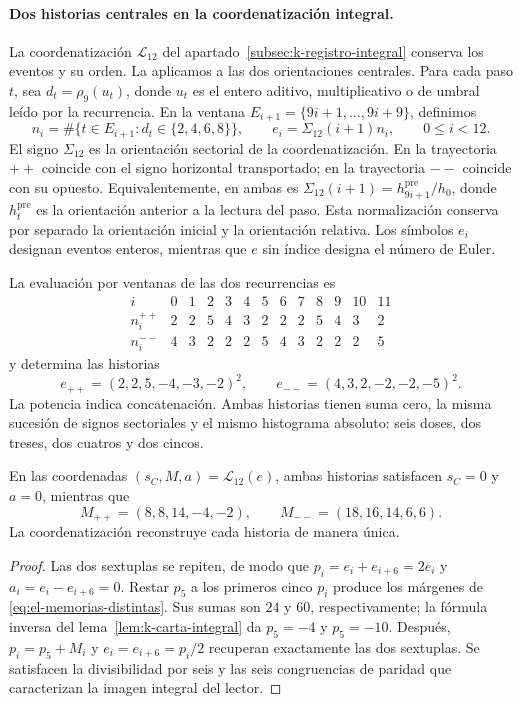 \paragraph{Dos historias centrales en la coordenatización integral.}
La coordenatización \(\mathcal L_{12}\) del
apartado~\ref{subsec:k-registro-integral} conserva los eventos y su
orden. La aplicamos a las dos orientaciones centrales. Para cada
paso \(t\), sea \(d_t=\rho_9(u_t)\), donde \(u_t\) es el entero
aditivo, multiplicativo o de umbral leído por la recurrencia.
En la ventana \(E_{i+1}=\{9i+1,\ldots,9i+9\}\), definimos
\[
 n_i=\#\{t\in E_{i+1}:d_t\in\{2,4,6,8\}\},\qquad
 e_i=\Sigma_{12}(i+1)n_i,\qquad0\le i<12.
\]
El signo \(\Sigma_{12}\) es la orientación sectorial de la coordenatización.
En la trayectoria \({++}\) coincide con el signo horizontal
transportado; en la trayectoria \({--}\) coincide con su opuesto.
Equivalentemente, en ambas es
\(\Sigma_{12}(i+1)=h^{\mathrm{pre}}_{9i+1}/h_0\), donde
\(h^{\mathrm{pre}}_t\) es la orientación anterior a la lectura del paso.
Esta normalización conserva por separado la orientación inicial y
la orientación relativa. Los símbolos \(e_i\) designan eventos
enteros, mientras que \(e\) sin índice designa el número de Euler.

La evaluación por ventanas de las dos recurrencias es
\[
\begin{array}{c|rrrrrrrrrrrr}
i&0&1&2&3&4&5&6&7&8&9&10&11\\\hline
n_i^{++}&2&2&5&4&3&2&2&2&5&4&3&2\\
n_i^{--}&4&3&2&2&2&5&4&3&2&2&2&5
\end{array}
\]
y determina las historias
\begin{equation}
 e_{++}=(2,2,5,-4,-3,-2)^2,\qquad
 e_{--}=(4,3,2,-2,-2,-5)^2.
 \label{eq:el-historias-centrales}
\end{equation}
La potencia indica concatenación. Ambas historias tienen suma cero,
la misma sucesión de signos sectoriales y el mismo histograma
absoluto: seis doses, dos treses, dos cuatros y dos cincos.

\begin{proposition}
\label{prop:el-memorias-distintas}
En las coordenadas \((s_C,M,a)=\mathcal L_{12}(e)\), ambas historias
satisfacen \(s_C=0\) y \(a=0\), mientras que
\begin{equation}
 M_{++}=(8,8,14,-4,-2),\qquad
 M_{--}=(18,16,14,6,6).
 \label{eq:el-memorias-distintas}
\end{equation}
La coordenatización reconstruye cada historia de manera única.
\end{proposition}
\begin{proof}
Las dos sextuplas se repiten, de modo que
\(p_i=e_i+e_{i+6}=2e_i\) y \(a_i=e_i-e_{i+6}=0\).
Restar \(p_5\) a los primeros cinco \(p_i\) produce los márgenes
de \eqref{eq:el-memorias-distintas}. Sus sumas son \(24\) y
\(60\), respectivamente; la fórmula inversa del
lema~\ref{lem:k-carta-integral} da \(p_5=-4\) y \(p_5=-10\).
Después, \(p_i=p_5+M_i\) y
\(e_i=e_{i+6}=p_i/2\) recuperan exactamente las dos sextuplas.
Se satisfacen la divisibilidad por seis y las seis congruencias de
paridad que caracterizan la imagen integral del lector.
\end{proof}

